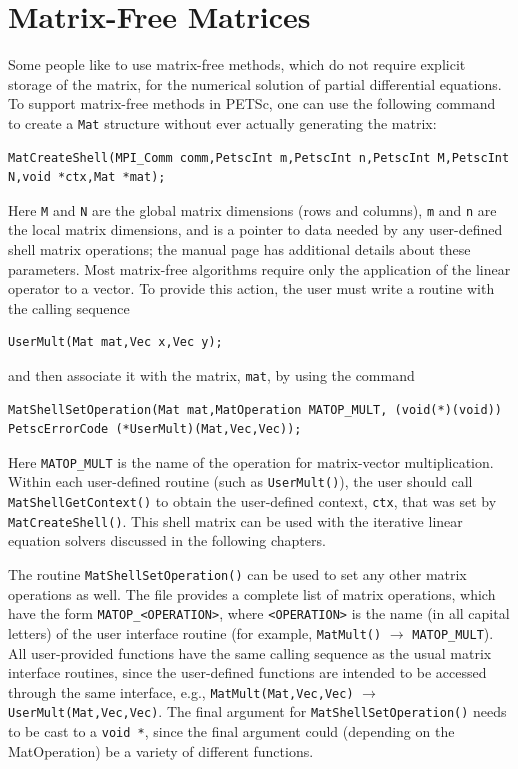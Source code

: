\section{Matrix-Free Matrices} 
\label{sec_matrixfree}
Some people like to use matrix-free methods, which do not require
explicit storage of the matrix, for the numerical solution of partial
differential equations.  To support matrix-free methods in PETSc, one
can use the following command to create a \lstinline{Mat} structure without
ever actually generating the matrix:
\begin{lstlisting}
MatCreateShell(MPI_Comm comm,PetscInt m,PetscInt n,PetscInt M,PetscInt N,void *ctx,Mat *mat);
\end{lstlisting}
Here \lstinline{M} and \lstinline{N} are the global matrix dimensions (rows and
columns), \lstinline{m} and \lstinline{n} are the local matrix dimensions, and
 is a pointer to data needed by any user-defined shell matrix
operations; the manual page has additional details about these
parameters.  Most matrix-free algorithms require only the application
of the linear operator to a vector. To provide this action, the user
must write a routine with the calling sequence
\begin{lstlisting}
UserMult(Mat mat,Vec x,Vec y);
\end{lstlisting}
and then associate it with the matrix, \lstinline{mat}, by using the
command
\begin{lstlisting}
MatShellSetOperation(Mat mat,MatOperation MATOP_MULT, (void(*)(void)) PetscErrorCode (*UserMult)(Mat,Vec,Vec));
\end{lstlisting}
Here \lstinline{MATOP_MULT} is the name of the operation for matrix-vector
multiplication. Within each user-defined routine (such as
\lstinline{UserMult()}), the user should call
\lstinline{MatShellGetContext()} to obtain the user-defined context, \lstinline{ctx},
that was set by \lstinline{MatCreateShell()}.
This shell matrix can be used with the iterative linear
equation solvers discussed in the following chapters.

The routine \lstinline{MatShellSetOperation()} can be used to set any other
matrix operations as well.  The file
\href{http://www.mcs.anl.gov/petsc/petsc-current/include/petscmat.h.html}{} provides a complete list of matrix
operations, which have the form \lstinline{MATOP_<OPERATION>}, where \lstinline{<OPERATION>} is the name (in all capital letters) of the user
interface routine (for example, \lstinline{MatMult()} $ \to $ \lstinline{MATOP_MULT}).  All
user-provided functions have the same calling sequence as the
usual matrix interface routines, since the user-defined functions are
intended to be accessed through the same interface, e.g.,
\lstinline{MatMult(Mat,Vec,Vec)} $ \to$ \lstinline{UserMult(Mat,Vec,Vec)}.
The final argument for \lstinline{MatShellSetOperation()} needs to be cast
to a \lstinline{void *}, since the final argument could (depending on the
MatOperation) be a variety of different functions.

